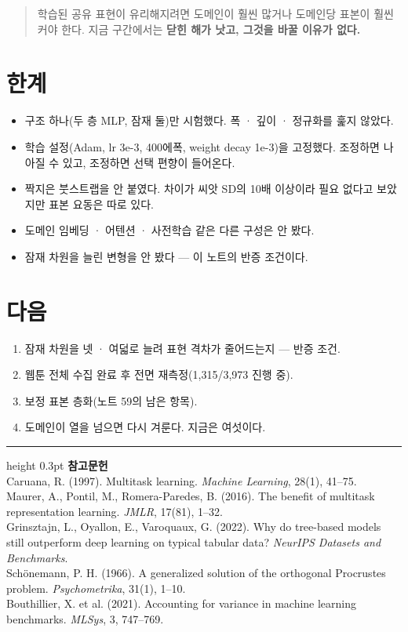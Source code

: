 \documentclass[10pt]{article}
\begin{document}
\begin{quote}\fontsize{9.5}{11.5}\selectfont
학습된 공유 표현이 유리해지려면 도메인이 훨씬 많거나 도메인당 표본이 훨씬 커야
한다. 지금 구간에서는 \textbf{닫힌 해가 낫고, 그것을 바꿀 이유가 없다.}
\end{quote}

\section{한계}

\begin{itemize}[leftmargin=1.1em,itemsep=0.15em]
\item 구조 하나(두 층 MLP, 잠재 둘)만 시험했다. 폭 · 깊이 · 정규화를 훑지 않았다.
\item 학습 설정(Adam, lr 3e-3, 400에폭, weight decay 1e-3)을 고정했다. 조정하면
      나아질 수 있고, 조정하면 선택 편향이 들어온다.
\item 짝지은 붓스트랩을 안 붙였다. 차이가 씨앗 SD의 10배 이상이라 필요 없다고
      보았지만 표본 요동은 따로 있다.
\item 도메인 임베딩 · 어텐션 · 사전학습 같은 다른 구성은 안 봤다.
\item 잠재 차원을 늘린 변형을 안 봤다 --- 이 노트의 반증 조건이다.
\end{itemize}

\section{다음}

\begin{enumerate}[leftmargin=1.3em,itemsep=0.15em]
\item 잠재 차원을 넷 · 여덟로 늘려 표현 격차가 줄어드는지 --- 반증 조건.
\item 웹툰 전체 수집 완료 후 전면 재측정(1,315/3,973 진행 중).
\item 보정 표본 층화(노트 59의 남은 항목).
\item 도메인이 열을 넘으면 다시 겨룬다. 지금은 여섯이다.
\end{enumerate}

\vspace{0.6em}
\hrule height 0.3pt
\vspace{0.5em}
{\footnotesize
\textbf{참고문헌}\\[0.3em]
Caruana, R. (1997). Multitask learning. \emph{Machine Learning}, 28(1), 41--75.\\[0.15em]
Maurer, A., Pontil, M., Romera-Paredes, B. (2016). The benefit of multitask
representation learning. \emph{JMLR}, 17(81), 1--32.\\[0.15em]
Grinsztajn, L., Oyallon, E., Varoquaux, G. (2022). Why do tree-based models still
outperform deep learning on typical tabular data? \emph{NeurIPS Datasets and
Benchmarks}.\\[0.15em]
Schönemann, P. H. (1966). A generalized solution of the orthogonal Procrustes
problem. \emph{Psychometrika}, 31(1), 1--10.\\[0.15em]
Bouthillier, X. et al. (2021). Accounting for variance in machine learning
benchmarks. \emph{MLSys}, 3, 747--769.
}
\end{document}
